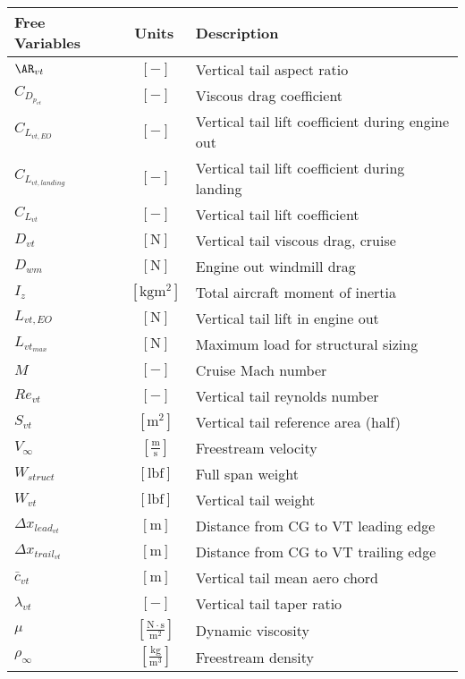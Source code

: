% 

{\footnotesize
\begin{supertabular}{lcl}
\toprule
Free Variables & Units & Description \\ \midrule
$\AR_{vt}$ & $~[-]$ & Vertical tail aspect ratio \\
$C_{D_{p_{vt}}}$ & $~[-]$ & Viscous drag coefficient \\
$C_{L_{vt,EO}}$ & $~[-]$ & Vertical tail lift coefficient during engine out \\
$C_{L_{vt,landing}}$ & $~[-]$ & Vertical tail lift coefficient during landing \\
$C_{L_{vt}}$ & $~[-]$ & Vertical tail lift coefficient \\
$D_{vt}$ & $~\mathrm{[N]}$ & Vertical tail viscous drag, cruise \\
$D_{wm}$ & $~\mathrm{[N]}$ & Engine out windmill drag \\
$I_{z}$ & $~\mathrm{[kg m^2]}$ & Total aircraft moment of inertia\\
$L_{vt,EO}$ & $~\mathrm{[N]}$ & Vertical tail lift in engine out \\
$L_{vt_{max}}$ & $~\mathrm{[N]}$ & Maximum load for structural sizing \\
$M$ & $~[-]$ & Cruise Mach number \\
$Re_{vt}$ & $~[-]$ & Vertical tail reynolds number\\
$S_{vt}$ & $~\mathrm{[m^{2}]}$ & Vertical tail reference area (half) \\
$V_{\infty}$ & $~\mathrm{[\tfrac{m}{s}]}$ & Freestream velocity \\
$W_{struct}$ & $~\mathrm{[lbf]}$ & Full span weight \\
$W_{vt}$ & $~\mathrm{[lbf]}$ & Vertical tail weight \\
$\Delta x_{lead_{vt}}$ & $~\mathrm{[m]}$ & Distance from CG to VT leading edge \\
$\Delta x_{trail_{vt}}$ & $~\mathrm{[m]}$ & Distance from CG to VT trailing edge \\
$\bar{c}_{vt}$ & $~\mathrm{[m]}$ & Vertical tail mean aero chord \\
$\lambda_{vt}$ & $~[-]$ & Vertical tail taper ratio \\
$\mu$ & $~\mathrm{[\tfrac{N\cdot s}{m^{2}}]}$ & Dynamic viscosity \\
$\rho_{\infty}$ & $~\mathrm{[\tfrac{kg}{m^{3}}]}$ & Freestream density\\

\end{supertabular}}
